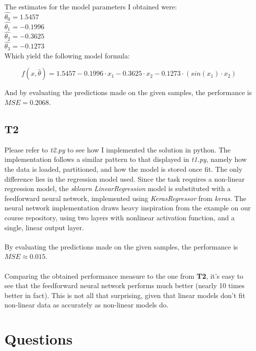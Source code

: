 \documentclass[12pt,a4paper]{article}
\begin{document}
The estimates for the model parameters I obtained were:\\
$\hat{\theta_0} =  1.5457$\\
$\hat{\theta_1} = -0.1996$\\
$\hat{\theta_2} = -0.3625$\\
$\hat{\theta_3} = -0.1273$\\

Which yield the following model formula:

\begin{equation*}
f(x,\hat{\theta}) = 1.5457 - 0.1996 \cdot x_1 - 0.3625 \cdot x_2 - 0.1273 \cdot (sin(x_1) \cdot x_2)
\end{equation*}

And by evaluating the predictions made on the given samples, the performance is \\$MSE = 0.2068$.

\newpage
\subsection*{T2}

Please refer to \textit{t2.py} to see how I implemented the solution in python. The implementation follows a similar pattern to that displayed in \textit{t1.py}, namely how the data is loaded, partitioned, and how the model is stored once fit. The only difference lies in the regression model used. Since the task requires a non-linear regression model, the \textit{sklearn} \textit{LinearRegression} model is substituted with a feedforward neural network, implemented using \textit{KerasRegressor} from \textit{keras}. The neural network implementation draws heavy inspiration from the example on our course repository, using two layers with nonlinear activation function, and a single, linear output layer.
\\\\
By evaluating the predictions made on the given samples, the performance is\\$MSE \approx 0.015$.\\\\
Comparing the obtained performance measure to the one from \textbf{T2}, it's easy to see that the feedforward neural network performs much better (nearly 10 times better in fact). This is not all that surprising, given that linear models don't fit non-linear data as accurately as non-linear models do.

\newpage
\section*{Questions}
\end{document}
